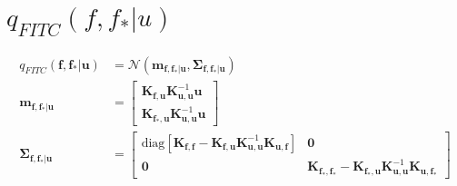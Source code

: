 \documentclass[12pt, landscape]{article}
\begin{document}
\section{$q_{FITC}(f,f_{*}|u)$}
\begingroup\makeatletter{}\check@mathfonts
\def\maketag@@@#1{\hbox{\m@th\large\normalfont#1}}
\begin{align*}
q_{FITC}\left(\mathbf{f},\mathbf{f_{*}}|\mathbf{u}\right)&= \mathcal{N}\left(\mathbf{m}_{\mathbf{f},\mathbf{f_{*}}|\mathbf{u}},\mathbf{\Sigma}_{\mathbf{f},\mathbf{f_{*}}|\mathbf{u}}\right)\\
\mathbf{m}_{\mathbf{f},\mathbf{f_{*}}|\mathbf{u}} &= \left[\begin{smallmatrix}\mathbf{K}_{\mathbf{f},\mathbf{u}} \mathbf{K}_{\mathbf{u},\mathbf{u}}^{-1} \mathbf{u}\\\mathbf{K}_{\mathbf{f_{*}},\mathbf{u}} \mathbf{K}_{\mathbf{u},\mathbf{u}}^{-1} \mathbf{u}\end{smallmatrix}\right]\\
\mathbf{\Sigma}_{\mathbf{f},\mathbf{f_{*}}|\mathbf{u}} &= \left[\begin{smallmatrix}\text{diag}[\mathbf{K}_{\mathbf{f},\mathbf{f}} - \mathbf{K}_{\mathbf{f},\mathbf{u}} \mathbf{K}_{\mathbf{u},\mathbf{u}}^{-1} \mathbf{K}_{\mathbf{u},\mathbf{f}}]&\mathbf{0}\\\mathbf{0}&\mathbf{K}_{\mathbf{f_{*}},\mathbf{f_{*}}} - \mathbf{K}_{\mathbf{f_{*}},\mathbf{u}} \mathbf{K}_{\mathbf{u},\mathbf{u}}^{-1} \mathbf{K}_{\mathbf{u},\mathbf{f_{*}}}\end{smallmatrix}\right]\\
\end{align*}\endgroup
\end{document}
